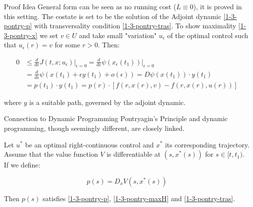 \documentclass[10pt, compress]{beamer}
\begin{document}
\begin{frame}{Proof Idea}
    General form can be seen as no running cost ($L\equiv0$), it is proved in this setting. The costate is set to be the solution of the Adjoint dynamic \ref{1-3-pontry-p} with transversality condition \ref{1-3-pontry-tras}. To show maximality \ref{1-3-pontry-x} we set $v\in U$ and take small "variation" $u_{\epsilon}$ of the optimal control such that $u_{\epsilon}(r)=v$ for some $r>0$. Then:

    \begin{align}
            0 & \leq \frac{d}{d\epsilon}J(t,x;u_{\epsilon})\big|_{\epsilon=0} = \frac{d}{d\epsilon}\psi(x_{\epsilon}(t_1))\big|_{\epsilon=0} \\
            & = \frac{d}{d\epsilon}\psi(x(t_1) + \epsilon y(t_1) + o(\epsilon)) = D\psi(x(t_1))\cdot y(t_1) \\
            & = p(t_1)\cdot y(t_1) = p(r)\cdot[f(r,x(r),v)-f(r,x(r),u(r))]
    \end{align}

    where $y$ is a suitable path, governed by the adjoint dynamic. 
\end{frame}

\begin{frame}{Connection to Dynamic Programming}
    Pontryagin's Principle and dynamic programming, though seemingly different, are closely linked.

    \begin{theorem}\label{1-3-pontrydyn}
    Let $u^{\ast}$ be an optimal right-continuous control and $x^{\ast}$ its corresponding trajectory. 
    Assume that the value function $V$ is differentiable at $(s,x^{\ast}(s))$ for $s\in[t,t_1)$. If we define:

    \begin{equation}\label{1-3-pontrydyn-defP}
        p(s) = D_x V(s,x^{\ast}(s)) 
    \end{equation}

    Then $p(s)$ satisfies \ref{1-3-pontry-p}, \ref{1-3-pontry-maxH} and \ref{1-3-pontry-tras}.
    \end{theorem}
\end{frame}
\end{document}
